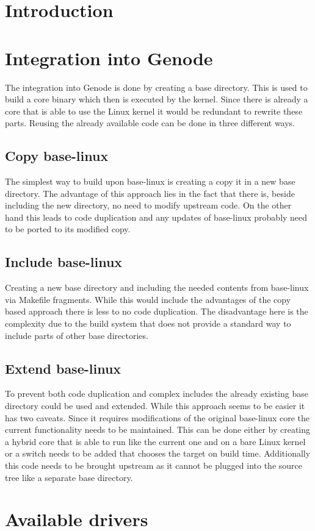 \documentclass[
a4paper,
12pt,
notitlepage,
parskip=half,
DIV=11,
]{scrartcl}
\begin{document}
\section{Introduction}
\section{Integration into Genode}
The integration into Genode is done by creating a base directory.
This is used to build a core binary which then is executed by the kernel.
Since there is already a core that is able to use the Linux kernel it would be redundant to rewrite these parts.
Reusing the already available code can be done in three different ways.
	\subsection{Copy base-linux}
	The simplest way to build upon base-linux is creating a copy it in a new base directory.
	The advantage of this approach lies in the fact that there is, beside including the new directory, no need to modify upstream code.
	On the other hand this leads to code duplication and any updates of base-linux probably need to be ported to its modified copy.
	\subsection{Include base-linux}
	Creating a new base directory and including the needed contents from base-linux via Makefile fragments.
	While this would include the advantages of the copy based approach there is less to no code duplication.
	The disadvantage here is the complexity due to the build system that does not provide a standard way to include parts of other base directories.
	\subsection{Extend base-linux}
	To prevent both code duplication and complex includes the already existing base directory could be used and extended.
	While this approach seems to be easier it has two caveats.
	Since it requires modifications of the original base-linux core the current functionality needs to be maintained.
	This can be done either by creating a hybrid core that is able to run like the current one and on a bare Linux kernel or a switch needs to be added that chooses the target on build time.
	Additionally this code needs to be brought upstream as it cannot be plugged into the source tree like a separate base directory.
\section{Available drivers}
\end{document}
